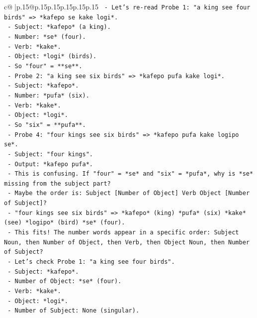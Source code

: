 \documentclass{article}
\begin{document}
{\begin{supertabular}{c@{$\;$}|p{.15\linewidth}@{}p{.15\linewidth}p{.15\linewidth}p{.15\linewidth}p{.15\linewidth}p{.15\linewidth}}
{{{\texttt{      {-} Let's re{-}read Probe 1: "a king see four birds" => *kafepo se kake logi*.} \\
\texttt{        {-} Subject: *kafepo* (a king).} \\
\texttt{        {-} Number: *se* (four).} \\
\texttt{        {-} Verb: *kake*.} \\
\texttt{        {-} Object: *logi* (birds).} \\
\texttt{        {-} So "four" = **se**.} \\
\texttt{      {-} Probe 2: "a king see six birds" => *kafepo pufa kake logi*.} \\
\texttt{        {-} Subject: *kafepo*.} \\
\texttt{        {-} Number: *pufa* (six).} \\
\texttt{        {-} Verb: *kake*.} \\
\texttt{        {-} Object: *logi*.} \\
\texttt{        {-} So "six" = **pufa**.} \\
\texttt{      {-} Probe 4: "four kings see six birds" => *kafepo pufa kake logipo se*.} \\
\texttt{        {-} Subject: "four kings".} \\
\texttt{        {-} Output: *kafepo pufa*.} \\
\texttt{        {-} This is confusing. If "four" = *se* and "six" = *pufa*, why is *se* missing from the subject part?} \\
\texttt{        {-} Maybe the order is: Subject {[}Number of Object{]} Verb Object {[}Number of Subject{]}?} \\
\texttt{        {-} "four kings see six birds" => *kafepo* (king) *pufa* (six) *kake* (see) *logipo* (bird) *se* (four).} \\
\texttt{        {-} This fits! The number words appear in a specific order: Subject Noun, then Number of Object, then Verb, then Object Noun, then Number of Subject?} \\
\texttt{        {-} Let's check Probe 1: "a king see four birds".} \\
\texttt{          {-} Subject: *kafepo*.} \\
\texttt{          {-} Number of Object: *se* (four).} \\
\texttt{          {-} Verb: *kake*.} \\
\texttt{          {-} Object: *logi*.} \\
\texttt{          {-} Number of Subject: None (singular).} \\
}}}
\end{supertabular}}
\end{document}
